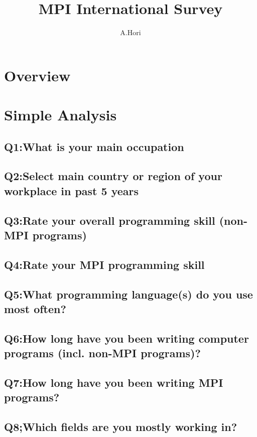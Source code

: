 \documentclass{report}
\title{MPI International Survey}
\author{A.Hori}
\begin{document}
\chapter{Overview}


\chapter{Simple Analysis}
\section{Q1:What is your main occupation}


\clearpage
\section{Q2:Select main country or region of your workplace in past 5 years}


\clearpage
\section{Q3:Rate your overall programming skill (non-MPI programs)}


\clearpage
\section{Q4:Rate your MPI programming skill}


\clearpage
\section{Q5:What programming language(s) do you use most often?}


\clearpage
\section{Q6:How long have you been writing computer programs (incl. non-MPI programs)?}


\clearpage
\section{Q7:How long have you been writing MPI programs?}


\clearpage
\section{Q8;Which fields are you mostly working in?}

\end{document}
